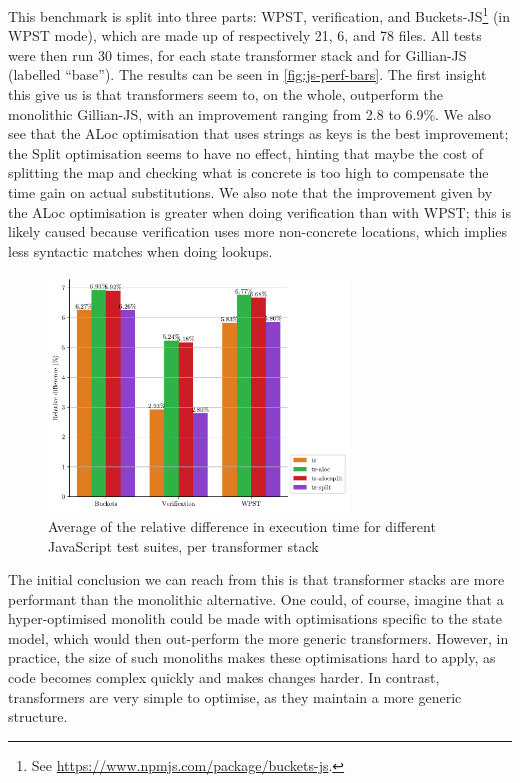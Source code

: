 This benchmark is split into three parts: WPST, verification, and Buckets-JS\footnote{See \url{https://www.npmjs.com/package/buckets-js}.} (in WPST mode), which are made up of respectively 21, 6, and 78 files. All tests were then run 30 times, for each state transformer stack and for Gillian-JS (labelled ``base''). The results can be seen in \autoref{fig:js-perf-bars}. The first insight this give us is that transformers seem to, on the whole, outperform the monolithic Gillian-JS, with an improvement ranging from 2.8 to 6.9\%. We also see that the ALoc optimisation that uses strings as keys is the best improvement; the Split optimisation seems to have no effect, hinting that maybe the cost of splitting the map and checking what is concrete is too high to compensate the time gain on actual substitutions. We also note that the improvement given by the ALoc optimisation is greater when doing verification than with WPST; this is likely caused because verification uses more non-concrete locations, which implies less syntactic matches when doing lookups.

\begin{figure}
	\centering
	\includegraphics[width=8cm]{figures/js/avg_mode_relative_diff}
	\caption{Average of the relative difference in execution time for different JavaScript test suites, per transformer stack}
	\label{fig:js-perf-bars}
\end{figure}

The initial conclusion we can reach from this is that transformer stacks are  more performant than the monolithic alternative. One could, of course, imagine that a hyper-optimised monolith could be made with optimisations specific to the state model, which would then out-perform the more generic transformers. However, in practice, the size of such monoliths makes these optimisations hard to apply, as code becomes complex quickly and makes changes harder. In contrast, transformers are very simple to optimise, as they maintain a more generic structure.

